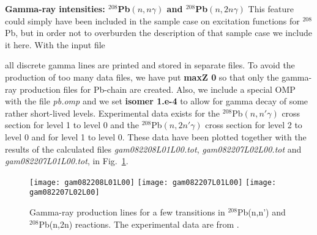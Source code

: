 \begin{samplecase}
{\bf Gamma-ray intensities: ${}^{208}$Pb$(n,n\gamma )$ and ${}^{208}$Pb$(n,2n\gamma )$}\newline
This feature could simply have been included in the sample case on 
excitation functions for ${}^{208}$Pb, but in order not to overburden the
description of that sample case we include it here. With the input file


all discrete gamma lines are printed and stored in separate files.
To avoid the production of too many data files, we have put {\bf maxZ 0} so 
that only the gamma-ray production files for Pb-chain are created. Also, we 
include a special OMP with
the file {\em pb.omp} and we set {\bf isomer 1.e-4} to allow for gamma decay
of some rather short-lived levels.
Experimental data exists for 
the ${}^{208}$Pb$(n,n'\gamma)$ cross section for level 1 to level 0 and
the ${}^{208}$Pb$(n,2n'\gamma)$ cross section for level 2 to level 0 and for 
level 1 to level 0. These
data have been plotted together with the results of the calculated files
{\em gam082208L01L00.tot}, {\em gam082207L02L00.tot} and 
{\em gam082207L01L00.tot}, in Fig.~\ref{pbgamma}.
\end{samplecase}
\begin{figure}
\centering\texttt{[image: gam082208L01L00]}
\centering\texttt{[image: gam082207L01L00]}
\centering\texttt{[image: gam082207L02L00]}
\caption{Gamma-ray production lines for a few transitions in ${}^{208}$Pb(n,n')
and ${}^{208}$Pb(n,2n) reactions.
The experimental data are from \protect\cite{Vonach1994}.}
\label{pbgamma}
\end{figure}
